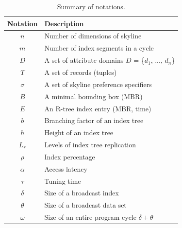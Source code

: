 \begin{table}[!t]
\centering \caption{Summary of notations.} \vspace*{5pt}
\label{tab:index_attr}
\begin{tabular}{|c|p{2.45in}|}
\hline
{\bf Notation} & {\bf Description}\\
\hline\hline
$n$ & Number of dimensions of skyline \\
$m$ & Number of index segments in a cycle \\
$D$ & A set of attribute domains $D$ = \{$d_1$, ..., $d_n$\} \\
$T$ & A set of records (tuples) \\
$\sigma$ & A set of skyline preference specifiers \\
$B$ & A minimal bounding box (MBR) \\
$E$ & An R-tree index entry (MBR, time) \\
$b$ & Branching factor of an index tree \\
$h$ & Height of an index tree \\
$L_r$ & Levels of index tree replication \\
$\rho$ & Index percentage \\
$\alpha$ & Access latency \\
$\tau$ & Tuning time \\
$\delta$ & Size of a broadcast index \\
$\theta$ & Size of a broadcast data set \\
$\omega$ & Size of an entire program cycle $\delta + \theta$ \\
\hline
\end{tabular}
\end{table}

